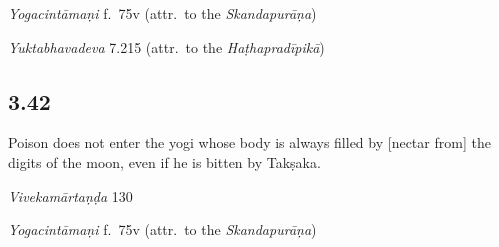 \begin{ekdosis}
\begin{testimonia}[hp03_041]
\emph{Yogacintāmaṇi} f.~75v (attr.~to the \emph{Skandapurāṇa})
\begin{versinnote}
\end{versinnote}

\emph{Yuktabhavadeva} 7.215 (attr.~to the \emph{Haṭhapradīpikā})
\begin{versinnote}
\end{versinnote}
\end{testimonia}


\subsection*{3.42}
\begin{translation}[hp03_042]
Poison does not enter the yogi whose body is always filled by [nectar from] the digits of the moon, even if he is bitten by Takṣaka.
\end{translation}

\begin{sources}[hp03_042]
\emph{Vivekamārtaṇḍa} 130
\begin{versinnote}
\tl{\var{pīḍayet ] pīḍyate, sarpati, bādhyate \vl}\\!}
\end{versinnote}
\end{sources}

\begin{testimonia}[hp03_042]
\emph{Yogacintāmaṇi} f.~75v (attr.~to the \emph{Skandapurāṇa})
\begin{versinnote}
\end{versinnote}


\end{testimonia}
\end{ekdosis}
